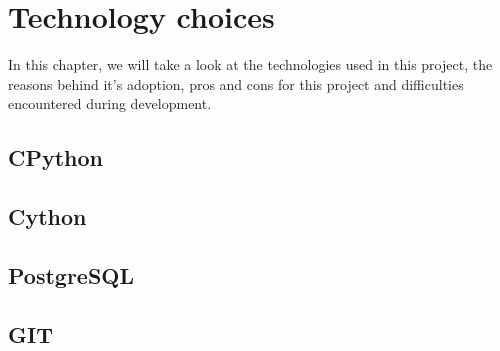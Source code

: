 \chapter{Technology choices}

  In this chapter, we will take a look at the technologies used in this project,
  the reasons behind it's adoption, pros and cons for this project and
  difficulties encountered during development.

  
  \section{CPython}
  \section{Cython}
  \section{PostgreSQL}
  \section{GIT}
